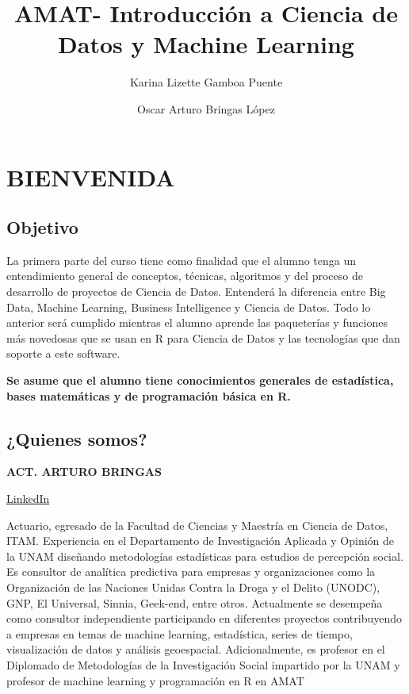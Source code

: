 \documentclass[
]{book}
\title{AMAT- Introducción a Ciencia de Datos y Machine Learning}
\author{Karina Lizette Gamboa Puente \and Oscar Arturo Bringas López}
\date{}
\begin{document}
\maketitle

{
\setcounter{tocdepth}{1}
\tableofcontents
}
\hypertarget{bienvenida}{%
\chapter{BIENVENIDA}\label{bienvenida}}

\hypertarget{objetivo}{%
\section{Objetivo}\label{objetivo}}

La primera parte del curso tiene como finalidad que el alumno tenga un entendimiento general de conceptos, técnicas, algoritmos y del proceso de desarrollo de proyectos de Ciencia de Datos.
Entenderá la diferencia entre Big Data, Machine Learning, Business Intelligence y Ciencia de Datos.
Todo lo anterior será cumplido mientras el alumno aprende las paqueterías y funciones más novedosas que se usan en R para Ciencia de Datos y las tecnologías que dan soporte a este software.

\textbf{Se asume que el alumno tiene conocimientos generales de estadística, bases matemáticas y de programación básica en R.}

\hypertarget{quienes-somos}{%
\section{¿Quienes somos?}\label{quienes-somos}}

\textbf{ACT. ARTURO BRINGAS}

\href{https://www.linkedin.com/in/arturo-bringas/}{LinkedIn}

Actuario, egresado de la Facultad de Ciencias y Maestría en Ciencia de Datos, ITAM.
Experiencia en el Departamento de Investigación Aplicada y Opinión de la UNAM diseñando metodologías estadísticas para estudios de percepción social. Es consultor de analítica predictiva para empresas y organizaciones como la Organización de las Naciones Unidas Contra la Droga y el Delito (UNODC), GNP, El Universal, Sinnia, Geek-end, entre otros. Actualmente se desempeña como consultor independiente participando en diferentes proyectos contribuyendo a empresas en temas de machine learning, estadística, series de tiempo, visualización de datos y análisis geoespacial. Adicionalmente, es profesor en el Diplomado de Metodologías de la Investigación Social impartido por la UNAM y profesor de machine learning y programación en R en AMAT
\end{document}
